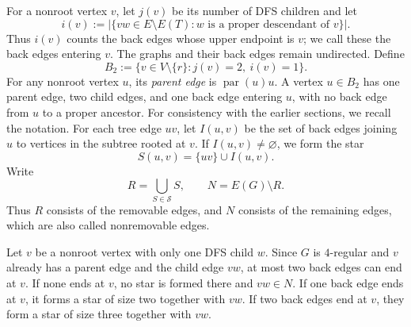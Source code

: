 \documentclass[11pt]{amsart}
\newcommand{\1}{\mathbbm{1}}
\begin{document}
For a nonroot vertex $v$, let $j(v)$ be its number of DFS children and let
\[
 i(v):=\bigl|\{vw\in E\setminus E(T):
                  w\text{ is a proper descendant of }v\}\bigr|.
\]
Thus $i(v)$ counts the back edges whose upper endpoint is $v$;
we call these the back edges entering $v$. The graphs and their
back edges remain undirected. Define
\[
 B_2:=\{v\in V\setminus\{r\}:j(v)=2,\ i(v)=1\}.
\]
For any nonroot vertex $u$, its \emph{parent edge} is
$\operatorname{par}(u)u$.
A vertex $u\in B_2$ has one parent edge, two child edges, and one
back edge entering $u$, with no back edge from $u$ to a proper
ancestor. For consistency with the earlier sections, we recall the
notation. For each tree edge $uv$, let $I(u,v)$ be the set
of back edges joining $u$ to vertices in the subtree rooted
at $v$. If $I(u,v)\ne\varnothing$, we form the star
\[
 S(u,v)=\{uv\}\cup I(u,v).
\]
Write
\[
 R=\bigcup_{S\in\mathcal S}S,
 \qquad N=E(G)\setminus R.
\]
Thus $R$ consists of the removable edges, and $N$ consists
of the remaining edges, which are also called nonremovable edges.

Let $v$ be a nonroot vertex with only one DFS child $w$.
Since $G$ is $4$-regular and $v$ already has a parent edge
and the child edge $vw$, at most two back edges can end at $v$.
If none ends at $v$, no star is formed there and $vw\in N$.
If one back edge ends at $v$, it forms a star of size two
together with $vw$. If two back edges end at $v$, they form
a star of size three together with $vw$.
\end{document}
